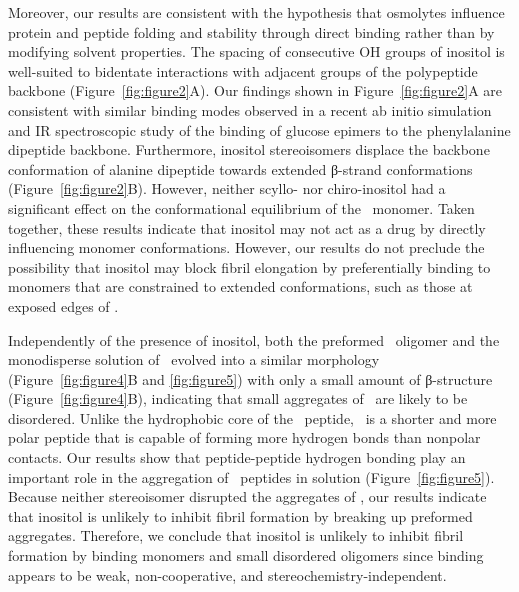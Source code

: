 Moreover, our results are consistent with the hypothesis that osmolytes influence protein and peptide folding and stability through direct binding rather than by modifying solvent properties.\cite{Canchi:2011p53,Lee:2010p59,Street:2006p21} The spacing of consecutive OH groups of inositol is well-suited to bidentate interactions with adjacent groups of the polypeptide backbone (Figure~\ref{fig:figure2}A). Our findings shown in Figure~\ref{fig:figure2}A are consistent with similar binding modes observed in a recent ab initio simulation and IR spectroscopic study of the binding of glucose epimers to the phenylalanine dipeptide backbone.\cite{Cocinero:2011p54} Furthermore, inositol stereoisomers displace the backbone conformation of alanine dipeptide towards extended β-strand conformations (Figure~\ref{fig:figure2}B). However, neither scyllo- nor chiro-inositol had a significant effect on the conformational equilibrium of the \gafour\ monomer. Taken together, these results indicate that inositol may not act as a drug by directly influencing monomer conformations. However, our results do not preclude the possibility that inositol may block fibril elongation by preferentially binding to monomers that are constrained to extended conformations, such as those at exposed edges of \bsheets.

Independently of the presence of inositol, both the preformed \bsheet\ oligomer and the monodisperse solution of \gafour\ evolved into a similar morphology (Figure~\ref{fig:figure4}B and \ref{fig:figure5}) with only a small amount of β-structure (Figure~\ref{fig:figure4}B), indicating that small aggregates of \gafour\ are likely to be disordered. Unlike the hydrophobic core of the \abeta\ peptide, \gafour\ is a shorter and more polar peptide that is capable of forming more hydrogen bonds than nonpolar contacts. Our results show that peptide-peptide hydrogen bonding play an important role in the aggregation of \gafour\ peptides in solution (Figure~\ref{fig:figure5}). Because neither stereoisomer disrupted the aggregates of \gafour, our results indicate that inositol is unlikely to inhibit fibril formation by breaking up preformed aggregates. Therefore, we conclude that inositol is unlikely to inhibit fibril formation by binding monomers and small disordered oligomers since binding appears to be weak, non-cooperative, and stereochemistry-independent.

